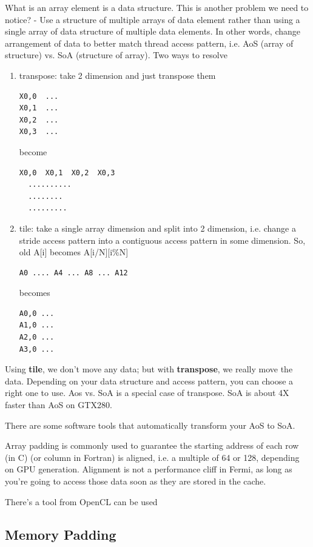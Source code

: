 What is an array element is a data structure. This is another problem
we need to notice? - Use a structure of multiple arrays of data
element rather than using a single array of data structure of multiple
data elements. In other words, change arrangement of data to better
match thread access pattern, i.e. AoS (array of structure) vs. SoA
(structure of array). Two ways to resolve
\begin{enumerate}
\item transpose: take 2 dimension and just transpose them
\begin{verbatim}
X0,0  ...
X0,1  ...
X0,2  ...
X0,3  ...
\end{verbatim}
become
\begin{verbatim}
X0,0  X0,1  X0,2  X0,3
  ..........
  ........
  .........
\end{verbatim}

\item tile: take a single array dimension and split into 2 dimension,
  i.e. change a stride access pattern into a contiguous
  access pattern in some dimension. So, old A[i] becomes A[i/N][i\%N]
\begin{verbatim}
A0 .... A4 ... A8 ... A12
\end{verbatim}
  becomes
\begin{verbatim}
A0,0 ...
A1,0 ...
A2,0 ...
A3,0 ...
\end{verbatim}

\end{enumerate}
Using {\bf tile}, we don't move any data; but with {\bf transpose}, we
really move the data. Depending on your data structure and access
pattern, you can choose a right one to use. Aos vs. SoA is a special
case of transpose. SoA is about 4X faster than AoS on GTX280. 


\begin{framed}
  There are some software tools that automatically transform your AoS
  to SoA. 
\end{framed}

Array padding is commonly used to guarantee the starting address of
each row (in C) (or column in Fortran) is aligned, i.e. a multiple of
64 or 128, depending on GPU generation. Alignment is not a performance
cliff in Fermi, as long as you're going to access those data soon as
they are stored in the cache. 


There's a tool from OpenCL can be used




\subsection{Memory Padding}

